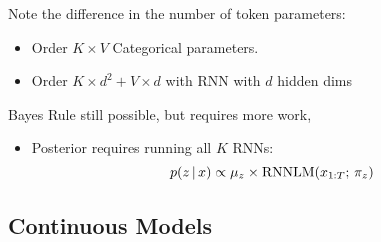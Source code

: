 \begin{frame}
Note the difference in the number of token parameters: 
\begin{itemize}
    \item Order $K \times V $ Categorical parameters.
    \item Order $K \times d^2 + V \times d$ with RNN with $d$ hidden dims
\end{itemize}

\vspace{0.5cm}

Bayes Rule still possible, but requires more work,
\begin{itemize}
    \item Posterior requires running all $K$ RNNs: \[p(z \,|\, x) \propto \mu_{z} \times \displaystyle \operatorname*{RNNLM}(x_{1:T} ; \, \pi_z) \]
\end{itemize}

    
\end{frame}







\subsection{Continuous Models}

